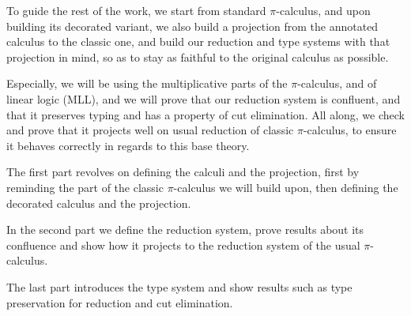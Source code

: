 To guide the rest of the work, we start from standard $\pi$-calculus, and upon building its decorated variant, we also build a projection from the annotated calculus to the classic one, and build our reduction and type systems with that projection in mind, so as to stay as faithful to the original calculus as possible.

Especially, we will be using the multiplicative parts of the $\pi$-calculus, and of linear logic (MLL), and we will prove that our reduction system is confluent, and that it preserves typing and has a property of cut elimination. All along, we check and prove that it projects well on usual reduction of classic $\pi$-calculus, to ensure it behaves correctly in regards to this base theory.

\bigskip

The first part revolves on defining the calculi and the projection, first by reminding the part of the classic $\pi$-calculus we will build upon, then defining the decorated calculus and the projection.

In the second part we define the reduction system, prove results about its confluence and show how it projects to the reduction system of the usual $\pi$-calculus.

The last part introduces the type system and show results such as type preservation for reduction and cut elimination.